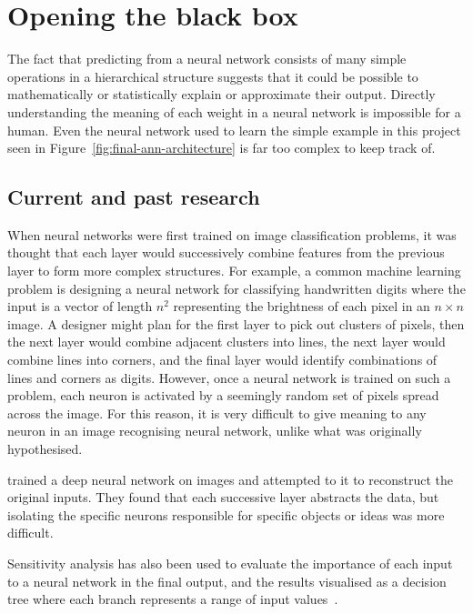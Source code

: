
\chapter{Opening the black box}

The fact that predicting from a neural network consists of many simple operations in a hierarchical structure suggests that it could be possible to mathematically or statistically explain or approximate their output.
Directly understanding the meaning of each weight in a neural network is impossible for a human.
Even the neural network used to learn the simple example in this project seen in Figure~\ref{fig:final-ann-architecture} is far too complex to keep track of.

\section{Current and past research}

When neural networks were first trained on image classification problems, it was thought that each layer would successively combine features from the previous layer to form more complex structures.
For example, a common machine learning problem is designing a neural network for classifying handwritten digits where the input is a vector of length \(n^2\) representing the brightness of each pixel in an \(n \times n\) image.
A designer might plan for the first layer to pick out clusters of pixels, then the next layer would combine adjacent clusters into lines, the next layer would combine lines into corners, and the final layer would identify combinations of lines and corners as digits.
However, once a neural network is trained on such a problem, each neuron is activated by a seemingly random set of pixels spread across the image.
For this reason, it is very difficult to give meaning to any neuron in an image recognising neural network, unlike what was originally hypothesised.

\textcite{mahendran2014} trained a deep neural network on images and attempted to  it to reconstruct the original inputs.
They found that each successive layer abstracts the data, but isolating the specific neurons responsible for specific objects or ideas was more difficult.

Sensitivity analysis has also been used to evaluate the importance of each input to a neural network in the final output, and the results visualised as a decision tree where each branch represents a range of input values~\autocite[13]{cortez2013}.

